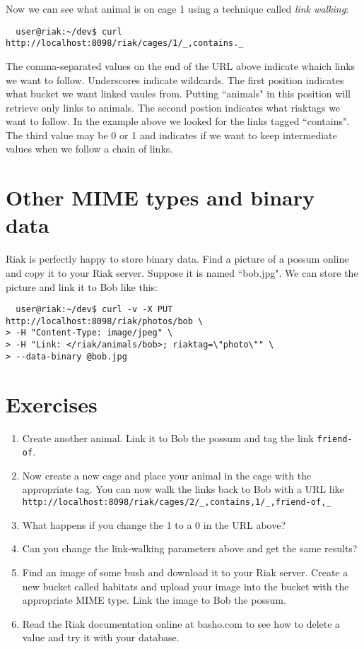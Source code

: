 \documentclass{article}
\begin{document}
Now we can see what animal is on cage 1 using a technique called \emph{link walking}:
\begin{verbatim}
  user@riak:~/dev$ curl http://localhost:8098/riak/cages/1/_,contains._
\end{verbatim}
The comma-separated values on the end of the URL above indicate whaich links we want to follow.  Underscores indicate wildcards.  The first position indicates what bucket we want linked vaules from. Putting ``animals" in this position will retrieve only links to animals.  The second postion indicates what riaktags we want to follow.  In the example above we looked for the links tagged ``contains".  The third value may be 0 or 1 and indicates if we want to keep intermediate values when we follow a chain of links.

\section{Other MIME types and binary data}
Riak is perfectly happy to store binary data.  Find a picture of a possum online and copy it to your Riak server.  Suppose it is named ``bob.jpg".  We can store the picture and link it to Bob like this:

\begin{verbatim}
  user@riak:~/dev$ curl -v -X PUT http://localhost:8098/riak/photos/bob \
> -H "Content-Type: image/jpeg" \
> -H "Link: </riak/animals/bob>; riaktag=\"photo\"" \
> --data-binary @bob.jpg
\end{verbatim}

\section{Exercises}
\begin{enumerate}
  \item Create another animal.  Link it to Bob the possum and tag the link \texttt{friend-of}.
  \item Now create a new cage and place your animal in the cage with the appropriate tag.  You can now walk the links back to Bob with a URL like \\ \texttt{http://localhost:8098/riak/cages/2/\_,contains,1/\_,friend-of,\_}
  \item What happens if you change the 1 to a 0 in the URL above?
  \item Can you change the link-walking parameters above and get the same results?
  \item Find an image of some bush and download it to your Riak server.  Create a new bucket called habitats and upload your image into the bucket with the appropriate MIME type.  Link the image to Bob the possum.
      \item Read the Riak documentation online at basho.com to see how to delete a value and try it with your database.
\end{enumerate}






   
\end{document}
